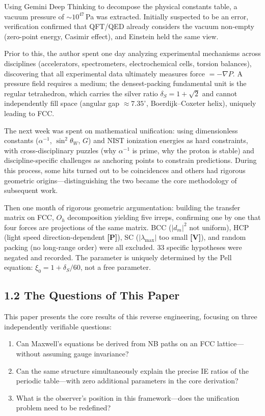 \documentclass[11pt,a4paper]{article}
\newcommand{\gradeP}{\textbf{[P]}}
\newcommand{\gradeV}{\textbf{[V]}}
\begin{document}
Using Gemini Deep Thinking to decompose the physical constants table, a vacuum pressure of $\sim 10^{47}$\,Pa was extracted. Initially suspected to be an error, verification confirmed that QFT/QED already considers the vacuum non-empty (zero-point energy, Casimir effect), and Einstein held the same view.

Prior to this, the author spent one day analyzing experimental mechanisms across disciplines (accelerators, spectrometers, electrochemical cells, torsion balances), discovering that all experimental data ultimately measures force $= -\nabla P$. A pressure field requires a medium; the densest-packing fundamental unit is the regular tetrahedron, which carries the silver ratio $\delta_S = 1+\sqrt{2}$ and cannot independently fill space (angular gap $\approx 7.35^\circ$, Boerdijk--Coxeter helix), uniquely leading to FCC.

The next week was spent on mathematical unification: using dimensionless constants ($\alpha^{-1}$, $\sin^2\theta_W$, $G$) and NIST ionization energies as hard constraints, with cross-disciplinary puzzles (why $\alpha^{-1}$ is prime, why the proton is stable) and discipline-specific challenges as anchoring points to constrain predictions. During this process, some hits turned out to be coincidences and others had rigorous geometric origins---distinguishing the two became the core methodology of subsequent work.

Then one month of rigorous geometric argumentation: building the transfer matrix on FCC, $O_h$ decomposition yielding five irreps, confirming one by one that four forces are projections of the same matrix. BCC ($|d_m|^2$ not uniform), HCP (light speed direction-dependent \gradeP), SC ($|\lambda_{\max}|$ too small \gradeV), and random packing (no long-range order) were all excluded. 33 specific hypotheses were negated and recorded. The parameter is uniquely determined by the Pell equation: $\xi_0 = 1 + \delta_S/60$, not a free parameter.

\subsection{1.2 The Questions of This Paper}

This paper presents the core results of this reverse engineering, focusing on three independently verifiable questions:

\begin{enumerate}[label=(\roman*)]
\item Can Maxwell's equations be derived from NB paths on an FCC lattice---without assuming gauge invariance?
\item Can the same structure simultaneously explain the precise IE ratios of the periodic table---with zero additional parameters in the core derivation?
\item What is the observer's position in this framework---does the unification problem need to be redefined?
\end{enumerate}
\end{document}
